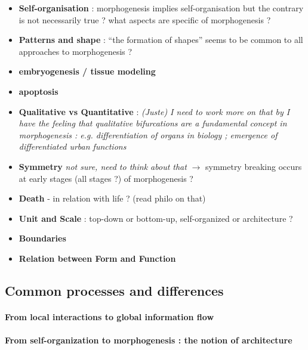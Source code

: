 \documentclass{article}
\begin{document}
\begin{itemize}
\item \textbf{Self-organisation} : morphogenesis implies self-organisation but the contrary is not necessarily true ? what aspects are specific of morphogenesis ? 
\item \textbf{Patterns and shape} : ``the formation of shapes'' seems to be common to all approaches to morphogenesis ?
\item \textbf{embryogenesis / tissue modeling}
\item \textbf{apoptosis}
\item \textbf{Qualitative vs Quantitative} : \textit{(Juste) I need to work more on that by I have the feeling that qualitative bifurcations are a fundamental concept in morphogenesis : e.g. differentiation of organs in biology ; emergence of differentiated urban functions}
\item \textbf{Symmetry} \textit{not sure, need to think about that} $\rightarrow$ symmetry breaking occurs at early stages (all stages ?) of morphogenesis ?
\item \textbf{Death} - in relation with life ? (read philo on that)
\item \textbf{Unit and Scale} : top-down or bottom-up, self-organized or architecture ?
\item \textbf{Boundaries}
\item \textbf{Relation between Form and Function}
\end{itemize}




\subsection{Common processes and differences}

\paragraph{From local interactions to global information flow}



\paragraph{From self-organization to morphogenesis : the notion of architecture}
\end{document}
